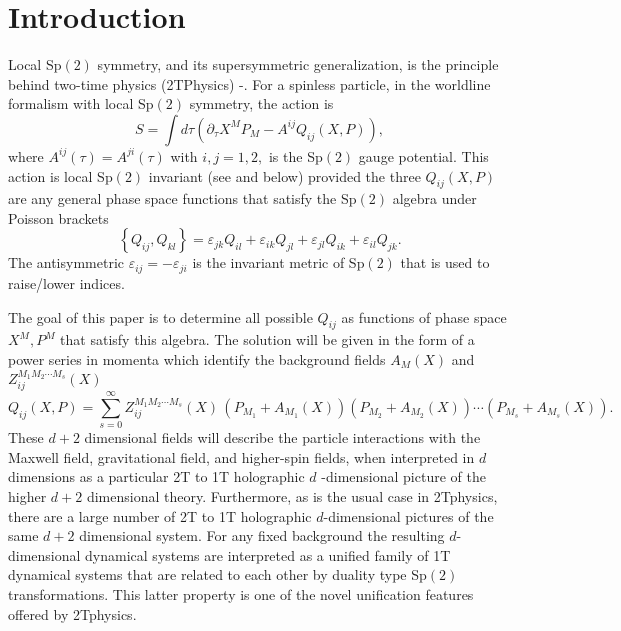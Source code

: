 \documentclass[a4paper,12pt]{article}
\begin{document}
\section{Introduction}

Local Sp$\left( 2\right) $ symmetry, and its supersymmetric generalization,
is the principle behind two-time physics (2TPhysics) \cite{survey2T}-\cite
{ncsp}. For a spinless particle, in the worldline formalism with local Sp$%
\left( 2\right) $ symmetry, the action is
\begin{equation}
S=\int d\tau \left( \partial _{\tau }X^{M}P_{M}-A^{ij}Q_{ij}\left(
X,P\right) \right) ,  \label{worldlineaction}
\end{equation}
where $A^{ij}\left( \tau \right) =A^{ji}\left( \tau \right) $ with $i,j=1,2,$
is the Sp$\left( 2\right) $ gauge potential. This action is local Sp$\left(
2\right) $ invariant (see \cite{emgrav} and below) provided the three $%
Q_{ij}\left( X,P\right) $ are any general phase space functions that satisfy
the Sp$\left( 2\right) $ algebra under Poisson brackets
\begin{equation}
\left\{ Q_{ij},Q_{kl}\right\} =\varepsilon _{jk}Q_{il}+\varepsilon
_{ik}Q_{jl}+\varepsilon _{jl}Q_{ik}+\varepsilon _{il}Q_{jk}.  \label{poisson}
\end{equation}
The antisymmetric $\varepsilon _{ij}=-\varepsilon _{ji}$ is the invariant
metric of Sp$\left( 2\right) $ that is used to raise/lower indices.

The goal of this paper is to determine all possible $Q_{ij}$ as functions of
phase space $X^{M},P^{M}$ that satisfy this algebra. The solution will be
given in the form of a power series in momenta which identify the background
fields $A_{M}\left( X\right) $ and $Z_{ij}^{M_{1}M_{2}\cdots M_{s}}\left(
X\right) $
\begin{equation}
Q_{ij}\left( X,P\right) =\sum_{s=0}^{\infty }Z_{ij}^{M_{1}M_{2}\cdots
M_{s}}\left( X\right) \,\left( P_{M_{1}}+A_{M_{1}}\left( X\right) \right)
\left( P_{M_{2}}+A_{M_{2}}\left( X\right) \right) \cdots \left(
P_{M_{s}}+A_{M_{s}}\left( X\right) \right) .  \label{expand}
\end{equation}
These $d+2$ dimensional fields will describe the particle interactions with
the Maxwell field, gravitational field, and higher-spin fields, when
interpreted in $d$ dimensions as a particular 2T to 1T holographic $d$%
-dimensional picture of the higher $d+2$ dimensional theory. Furthermore, as
is the usual case in 2Tphysics, there are a large number of 2T to 1T
holographic $d$-dimensional pictures of the same $d+2$ dimensional system.
For any fixed background the resulting $d$-dimensional dynamical systems are
interpreted as a unified family of 1T dynamical systems that are related to
each other by duality type Sp$\left( 2\right) $ transformations. This latter
property is one of the novel unification features offered by 2Tphysics.
\end{document}

